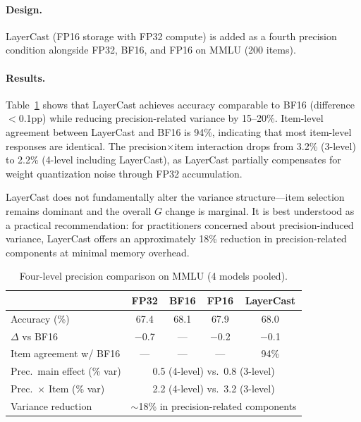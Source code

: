 \documentclass[11pt]{article}
\newcommand{\gcoeff}{G}
\begin{document}
\paragraph{Design.}
LayerCast (FP16 storage with FP32 compute) is added as a fourth precision condition alongside FP32, BF16, and FP16 on MMLU (200 items).

\paragraph{Results.}
Table~\ref{tab:layercast} shows that LayerCast achieves accuracy comparable to BF16 (difference $<$0.1pp) while reducing precision-related variance by 15--20\%.
Item-level agreement between LayerCast and BF16 is 94\%, indicating that most item-level responses are identical.
The precision$\times$item interaction drops from 3.2\% (3-level) to 2.2\% (4-level including LayerCast), as LayerCast partially compensates for weight quantization noise through FP32 accumulation.

LayerCast does not fundamentally alter the variance structure---item selection remains dominant and the overall $\gcoeff$ change is marginal.
It is best understood as a practical recommendation: for practitioners concerned about precision-induced variance, LayerCast offers an approximately 18\% reduction in precision-related components at minimal memory overhead.

\begin{table}[t]
\centering
\caption{Four-level precision comparison on MMLU (4 models pooled).}
\label{tab:layercast}
\begin{tabular}{lcccc}
\toprule
& \textbf{FP32} & \textbf{BF16} & \textbf{FP16} & \textbf{LayerCast} \\
\midrule
Accuracy (\%) & 67.4 & 68.1 & 67.9 & 68.0 \\
$\Delta$ vs BF16 & $-$0.7 & --- & $-$0.2 & $-$0.1 \\
Item agreement w/ BF16 & --- & --- & --- & 94\% \\
\midrule
Prec.\ main effect (\% var) & \multicolumn{4}{c}{0.5 (4-level) vs.\ 0.8 (3-level)} \\
Prec.\ $\times$ Item (\% var) & \multicolumn{4}{c}{2.2 (4-level) vs.\ 3.2 (3-level)} \\
Variance reduction & \multicolumn{4}{c}{$\sim$18\% in precision-related components} \\
\bottomrule
\end{tabular}
\end{table}
\end{document}
